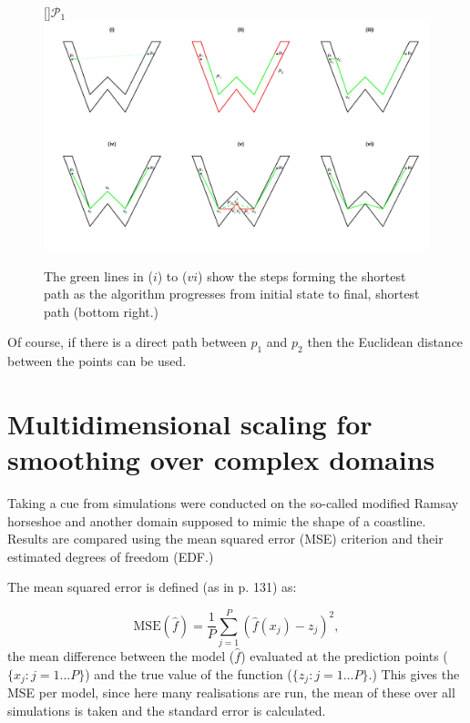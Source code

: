 \documentclass[a4paper,10pt]{article}
\begin{document}
\begin{figure}
\centering
[]{$\mathcal{P}_1$}
\includegraphics[trim=0in 0.5in 0in 0.25in, width=9.5in]{figs/wdia.pdf} \\
\caption{The green lines in ($i$) to ($vi$) show the steps forming the shortest path as the algorithm progresses from initial state to final, shortest path (bottom right.) }
\label{wdia}
\end{figure}

Of course, if there is a direct path between $p_1$ and $p_2$ then the Euclidean distance between the points can be used.

\section{Multidimensional scaling for smoothing over complex domains}

Taking a cue from \cite{soap} simulations were conducted on the so-called modified Ramsay horseshoe and another domain supposed to mimic the shape of a coastline. Results are compared using the mean squared error (MSE) criterion and their estimated degrees of freedom (EDF.)

The mean squared error is defined (as in \cite{simonbook} p. 131) as:

\begin{equation}
\text{MSE}(\hat{f}) = \frac{1}{P} \sum_{j=1}^P (\hat{f}(x_j) - z_j)^2,
\end{equation}
the mean difference between the model ($\hat{f}$) evaluated at the prediction points ($\{x_j : j=1 \dots P\}$) and the true value of the function ($\{z_j : j=1 \dots P\}$.) This gives the MSE per model, since here many realisations are run, the mean of these over all simulations is taken and the standard error is calculated.
\end{document}
